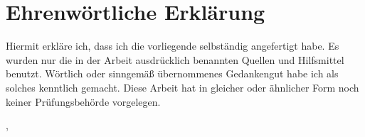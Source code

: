 
\section*{Ehrenwörtliche Erklärung}

Hiermit erkläre ich, dass ich die vorliegende \dokumententyp{} selbständig angefertigt habe. Es wurden nur die in der Arbeit ausdrücklich benannten Quellen und Hilfsmittel benutzt. Wörtlich oder sinngemäß übernommenes Gedankengut habe ich als solches kenntlich gemacht. Diese Arbeit hat in gleicher oder ähnlicher Form noch keiner Prüfungsbehörde vorgelegen.
\vspace{20mm}

\ort, \abgabedatum
\vspace{10mm}

\underline{\hspace{8cm}}\\\dokumentenautor